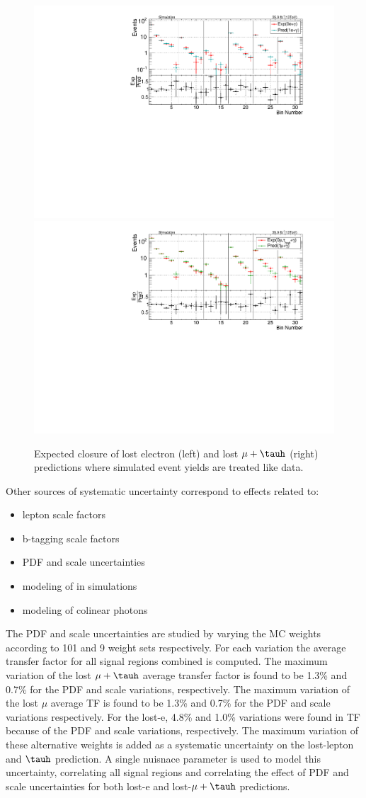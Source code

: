 \begin{figure}
\centering
\includegraphics[width=0.48\linewidth]{../Figures/Chap3/SUSY_Photon_MET_JbJ_18Aug17/LostEle_Closure/AllSBins_v7_Ele0AllSBins_v7_Ele1.pdf}
\includegraphics[width=0.48\linewidth]{../Figures/Chap3/SUSY_Photon_MET_JbJ_18Aug17/LostMu_Closure/AllSBins_v7_Mu0AllSBins_v7_Mu1.pdf}
\captionsetup{width=.9\linewidth}
\caption[Closure for lost lepton and \tauh]{Expected closure of lost electron (left) and lost $\mu+\tauh$ (right) predictions
where simulated event yields are treated like data.}
\label{fig:lost_lepton_closure}
\end{figure}

Other sources of systematic uncertainty correspond to effects related to:
\begin{itemize}
  \item lepton scale factors
  \item b-tagging scale factors
  \item PDF and scale uncertainties
  \item modeling of \mt in simulations
  \item modeling of colinear photons 
\end{itemize}

The PDF and scale uncertainties are studied by varying the MC weights according
to 101 and 9 weight sets respectively.  For each variation the average transfer factor for
all signal regions combined is computed.  
The maximum variation of the lost $\mu+\tauh$
average transfer factor is found to be 1.3\% and 0.7\% for the PDF and scale variations, 
respectively.  
The maximum variation of the lost $\mu$ average TF is found to be 1.3\% and 0.7\% for the PDF and scale variations respectively.
For the lost-e, 4.8\% and 1.0\% variations were found in TF because of the PDF and scale variations, respectively.
The maximum variation of these alternative weights is added as a systematic 
uncertainty on the lost-lepton and $\tauh$ prediction. A single nuisnace parameter
is used to model this uncertainty, correlating all signal regions and correlating
the effect of PDF and scale uncertainties for both lost-e and lost-$\mu+\tauh$
predictions. 

